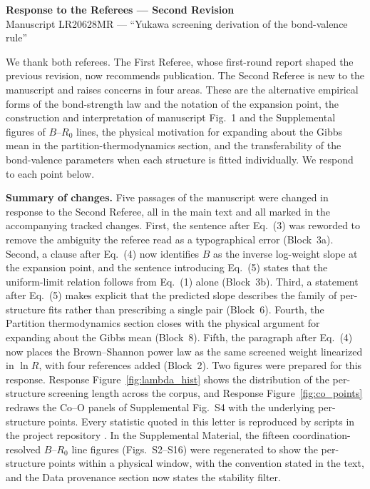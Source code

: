 \documentclass[11pt]{article}
\begin{document}
\begin{center}
{\large\bfseries Response to the Referees --- Second Revision}\\[2pt]
Manuscript LR20628MR --- ``Yukawa screening derivation of the bond-valence rule''
\end{center}

We thank both referees.  The First Referee, whose first-round report
shaped the previous revision, now recommends publication.  The Second
Referee is new to the manuscript and raises concerns in four areas.
These are the alternative empirical forms of the bond-strength law and
the notation of the expansion point, the construction and
interpretation of manuscript Fig.~1 and the Supplemental figures of $B$--$R_0$
lines, the physical motivation for expanding about the Gibbs mean in
the partition-thermodynamics section, and the transferability of the
bond-valence parameters when each structure is fitted individually.
We respond to each point below.

\textbf{Summary of changes.}  Five passages of the manuscript were
changed in response to the Second Referee, all in the main text and
all marked in the accompanying tracked changes.  First, the sentence
after Eq.~(3) was reworded to remove the ambiguity the referee read as a
typographical error (Block~3a).  Second, a clause after Eq.~(4) now
identifies $B$ as the inverse log-weight slope at the expansion
point, and the sentence introducing Eq.~(5) states that the
uniform-limit relation follows from Eq.~(1) alone (Block~3b).  Third,
a statement after Eq.~(5) makes explicit that the predicted slope
describes the family of per-structure fits rather than prescribing a
single pair (Block~6).  Fourth, the Partition thermodynamics section
closes with the physical argument for expanding about the Gibbs mean
(Block~8).  Fifth, the paragraph after Eq.~(4) now places the
Brown--Shannon power law as the same screened weight linearized in
$\ln R$, with four references added (Block~2).  Two figures were
prepared for this response.  Response
Figure~\ref{fig:lambda_hist} shows the distribution of the
per-structure screening length across the corpus, and Response
Figure~\ref{fig:co_points} redraws the Co--O panels of Supplemental
Fig.~S4 with the underlying per-structure points.  Every statistic
quoted in this letter is reproduced by scripts in the project
repository \cite{YukawaScreeningRepo}.  In the Supplemental Material, the fifteen coordination-resolved
$B$--$R_0$ line figures (Figs.~S2--S16) were regenerated to show the
per-structure points within a physical window, with the convention
stated in the text, and the Data provenance section now states the
stability filter.
\end{document}
